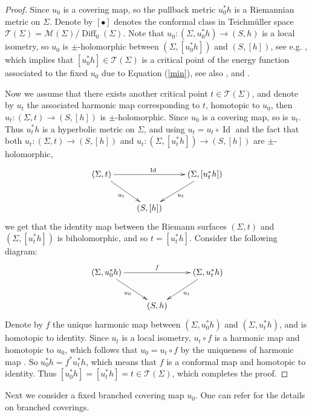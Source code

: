 \documentclass[11pt]{amsart}
\numberwithin{equation}{section}
\def\mc{\mathcal}
\theoremstyle{plain}
\theoremstyle{definition}
\theoremstyle{definition}
\def\op{\operatorname}
\begin{document}
\begin{proof}
Since $u_0$ is a covering map, so the pullback metric $u^*_0h$ is a Riemannian metric on $\Sigma$. Denote by $[\bullet]$ denotes the conformal class in Teichm\"uller space $\mc{T}(\Sigma)=\mc{M}(\Sigma)/\op{Diff}_0(\Sigma)$.  Note that $u_0:(\Sigma,u_0^*h)\to (S,h)$ is a local isometry, so $u_0$ is $\pm$-holomorphic between $(\Sigma,[u_0^*h])$ and $(S,[h])$, see e.g. \cite[Section 1.4]{Wood}, which implies that $[u_0^*h]\in \mc{T}(\Sigma)$ is a critical point of the energy function associated to the fixed $u_0$ due to Equation (\ref{min}), see also  \cite{SU,SU2}, and \cite[Proposition 2.2]{KWZ}.   


Now we assume that there exists another critical point $t\in\mc{T}(\Sigma)$, and denote by $u_{t}$ the associated harmonic map corresponding to $t$,  homotopic to $u_0$, then  $u_t: (\Sigma,t)\to (S,[h])$ is $\pm$-holomorphic. Since $u_0$ is a covering map, so is $u_t$. Thus $u_t^*h$ is a hyperbolic metric on $\Sigma$, and using $u_t=u_t\circ \op{Id}$ and the fact that both $u_t:(\Sigma,t)\to (S, [h])$ and $u_t:(\Sigma, [u_t^*h])\to (S,[h])$ are $\pm$-holomorphic,
\[
\xymatrix{
(\Sigma,t)\ar[rr]^{\op{Id}}\ar[rd]_{u_t}&&(\Sigma,[u_t^*h])\ar[ld]^{u_t}\\
&(S,[h])
}
\]
we get that the identity map  between the Riemann surfaces $(\Sigma,t)$ and $(\Sigma, [u_t^*h])$ is biholomorphic, 
 and so $t=[u^*_th]$. Consider the following diagram:
 \[
\xymatrix{
(\Sigma,u_0^*h)\ar[rr]^{f}\ar[rd]_{u_0}&&(\Sigma,u_t^*h)\ar[ld]^{u_t}\\
&(S,h)
}
\]
Denote by $f$ the unique harmonic map between $(\Sigma,u_0^*h)$ and $(\Sigma,u_t^*h)$, and is homotopic to identity. Since $u_t$ is a local isometry,  $u_t\circ f$ is a harmonic map and homotopic to $u_0$, which follows that $u_0=u_t\circ f$ by the uniqueness of harmonic map \cite{Hart}. So $u_0^*h=f^*u_t^*h$, which means that $f$ is a conformal map and homotopic to identity. Thus $[u_0^*h]=[u_t^*h]=t\in\mc{T}(\Sigma)$, which completes the proof. 
\end{proof}


Next we consider a fixed branched covering map $u_0$. One can refer \cite{BE, BM} for the details on branched coverings. 
\end{document}
